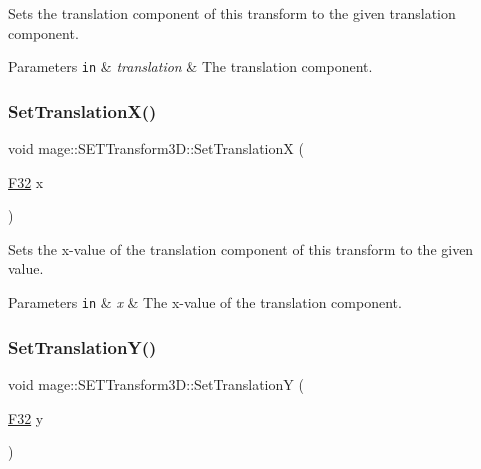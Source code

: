 Sets the translation component of this transform to the given translation component.


\begin{DoxyParams}[1]{Parameters}
\mbox{\tt in}  & {\em translation} & The translation component. \\
\hline
\end{DoxyParams}
\mbox{\label{classmage_1_1_s_e_t_transform3_d_a3df06b3195b19d99921e75c67d12b867}} 
\subsubsection{\texorpdfstring{Set\+Translation\+X()}{SetTranslationX()}}
{\footnotesize\ttfamily void mage\+::\+S\+E\+T\+Transform3\+D\+::\+Set\+TranslationX (\begin{DoxyParamCaption}\item[{\mbox{\hyperlink{namespacemage_aa97e833b45f06d60a0a9c4fc22ae02c0}{F32}}}]{x }\end{DoxyParamCaption})\hspace{0.3cm}{\ttfamily [noexcept]}}

Sets the x-\/value of the translation component of this transform to the given value.


\begin{DoxyParams}[1]{Parameters}
\mbox{\tt in}  & {\em x} & The x-\/value of the translation component. \\
\hline
\end{DoxyParams}
\mbox{\label{classmage_1_1_s_e_t_transform3_d_a8e7971f905661f95e3bf1780129eee93}} 
\subsubsection{\texorpdfstring{Set\+Translation\+Y()}{SetTranslationY()}}
{\footnotesize\ttfamily void mage\+::\+S\+E\+T\+Transform3\+D\+::\+Set\+TranslationY (\begin{DoxyParamCaption}\item[{\mbox{\hyperlink{namespacemage_aa97e833b45f06d60a0a9c4fc22ae02c0}{F32}}}]{y }\end{DoxyParamCaption})\hspace{0.3cm}{\ttfamily [noexcept]}}

